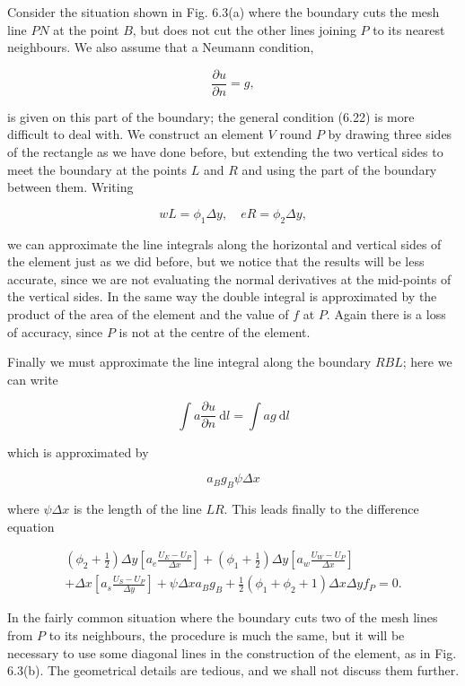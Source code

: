 \documentclass[10pt]{article}
\begin{document}
Consider the situation shown in Fig. 6.3(a) where the boundary cuts the mesh line \(P N\) at the point \(B\), but does not cut the other lines joining \(P\) to its nearest neighbours. We also assume that a Neumann condition,

\[
\frac{\partial u}{\partial n}=g,
\]

is given on this part of the boundary; the general condition (6.22) is more difficult to deal with. We construct an element \(V\) round \(P\) by drawing three sides of the rectangle as we have done before, but extending the two vertical sides to meet the boundary at the points \(L\) and \(R\) and using the part of the boundary between them. Writing

\[
w L=\phi_{1} \Delta y, \quad e R=\phi_{2} \Delta y,
\]

we can approximate the line integrals along the horizontal and vertical sides of the element just as we did before, but we notice that the results will be less accurate, since we are not evaluating the normal derivatives at the mid-points of the vertical sides. In the same way the double integral is approximated by the product of the area of the element and the value of \(f\) at \(P\). Again there is a loss of accuracy, since \(P\) is not at the centre of the element.

Finally we must approximate the line integral along the boundary \(R B L\); here we can write

\[
\int a \frac{\partial u}{\partial n} \mathrm{~d} l=\int a g \mathrm{~d} l
\]

which is approximated by

\[
a_{B} g_{B} \psi \Delta x
\]

where \(\psi \Delta x\) is the length of the line \(L R\). This leads finally to the difference equation

\[
\begin{gathered}
\left(\phi_{2}+\frac{1}{2}\right) \Delta y\left[a_{e} \frac{U_{E}-U_{P}}{\Delta x}\right]+\left(\phi_{1}+\frac{1}{2}\right) \Delta y\left[a_{w} \frac{U_{W}-U_{P}}{\Delta x}\right] \\
+\Delta x\left[a_{s} \frac{U_{S}-U_{P}}{\Delta y}\right]+\psi \Delta x a_{B} g_{B}+\frac{1}{2}\left(\phi_{1}+\phi_{2}+1\right) \Delta x \Delta y f_{P}=0 .
\end{gathered}
\]

In the fairly common situation where the boundary cuts two of the mesh lines from \(P\) to its neighbours, the procedure is much the same, but it will be necessary to use some diagonal lines in the construction of the element, as in Fig. 6.3(b). The geometrical details are tedious, and we shall not discuss them further.
\end{document}
